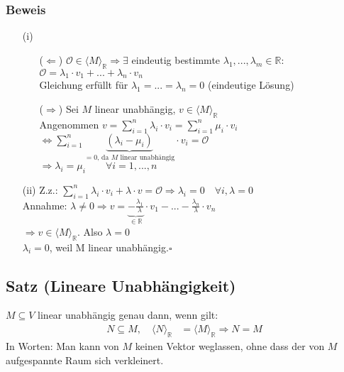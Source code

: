 \documentclass[a4paper, 12pt,titlepage, pdf, headsepline]{article}
\newcommand{\R}{\mathds{R}}
\newcommand{\vecspace}[2]{\langle#1\rangle_{#2}}
\newcommand{\vecspaceR}[1]{\vecspace{#1}{\R}}
\renewcommand{\>}{\rightarrow}
\renewcommand{\*}{\cdot}
\begin{document}
\subsubsection*{Beweis}
\begin{itemize}
	\item[(i)] 
	      \begin{itemize}
	      	\item[($\Leftarrow$)] $ \mathcal{O} \in \vecspaceR{M} \Rightarrow \exists$ eindeutig bestimmte $\lambda_1, ... , \lambda_m \in \R:$\\
	      	      \noindent\hspace*{23mm}$\mathcal{O} = \lambda_1 \cdot v_1 + ... + \lambda_n \cdot v_n$ \\
	      	      Gleichung erfüllt für $\lambda_1 = ... = \lambda_n = 0$ (eindeutige Lösung)
	      	\item[($\Rightarrow$)] Sei $M$ linear unabhängig, $v \in \vecspaceR{M}$\\
	      	      Angenommen $v = \sum_{i = 1}^{n} \lambda_i \cdot v_i = \sum_{i = 1}^{n} \mu_i \cdot v_i $\\
	      	      \noindent\hspace*{25mm}$\Leftrightarrow  \sum_{i=1}^{n} \underbrace{(\lambda_i - \mu_i)}_{=0\textrm{, da }M\textrm{ linear unabhängig}} \cdot v_i = \mathcal{O}$\\
	      	      \noindent\hspace*{25mm}$\Rightarrow \lambda_i = \mu_i \qquad \forall i = 1,...,n$
	      \end{itemize}
	\item[(ii)] Z.z.: $\sum_{i=1}^{n} \lambda_i \cdot v_i + \lambda \cdot v = \mathcal{O} \Rightarrow \lambda_i = 0 \quad\forall i, \lambda = 0$ \\
	      Annahme: $\lambda \neq 0 \Rightarrow v = \underbrace{-\frac{\lambda_1}{\lambda}}_{\in\R} \cdot v_1 - ... - \frac{\lambda_n}{\lambda} \cdot v_n $\\
	      \noindent\hspace*{29mm}$\Rightarrow v \in \vecspaceR{M}$\Lightning. Also $\lambda = 0$ \\
	      $\lambda_i = 0$, weil M linear unabhängig.\hfill$\square$
\end{itemize}
\subsection{Satz (Lineare Unabhängigkeit)}
\label{1.17}
$M \subseteq V$ linear unabhängig genau dann, wenn gilt:
\begin{align*}
	N \subseteq M,\quad \vecspaceR{N} & = \vecspaceR{M} \Rightarrow N = M 
\end{align*}
In Worten: Man kann von $M$ keinen Vektor weglassen, ohne dass der von $M$ aufgespannte Raum sich verkleinert.  \\
\end{document}
